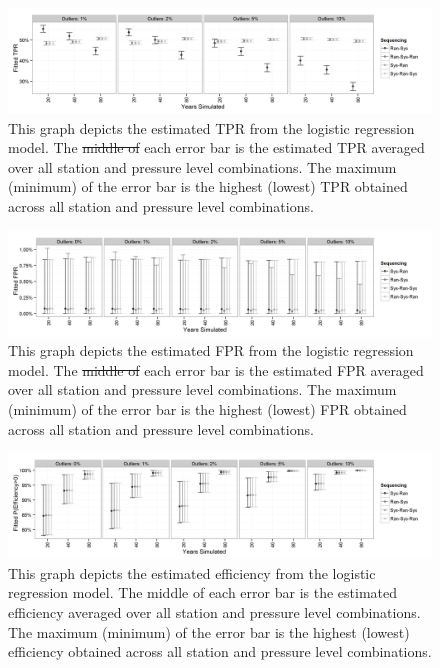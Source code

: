 \documentclass[12pt]{article}
\providecommand{\DIFaddtex}[1]{{\protect\color{blue}\uwave{#1}}} %
\providecommand{\DIFdeltex}[1]{{\protect\color{red}\sout{#1}}}                      %
\providecommand{\DIFaddFL}[1]{\DIFadd{#1}} %
\providecommand{\DIFdelFL}[1]{\DIFdel{#1}} %
\providecommand{\DIFaddbeginFL}{} %
\providecommand{\DIFaddendFL}{} %
\providecommand{\DIFdelbeginFL}{} %
\providecommand{\DIFdelendFL}{} %
\providecommand{\DIFadd}[1]{\texorpdfstring{\DIFaddtex{#1}}{#1}} %
\providecommand{\DIFdel}[1]{\texorpdfstring{\DIFdeltex{#1}}{}} %
\begin{document}
\begin{figure}[h!]
	\centering
	\includegraphics[width=\textwidth]{TPR_Order_Plot_BW}
	\caption{This graph depicts the estimated TPR from the logistic regression model.  The \DIFdelbeginFL \DIFdelFL{middle of }\DIFdelendFL \DIFaddbeginFL \DIFaddFL{dot in }\DIFaddendFL each error bar is the estimated TPR averaged over all station and pressure level combinations.  The maximum (minimum) of the error bar is the highest (lowest) TPR obtained across all station and pressure level combinations.}
	\label{fig:fitTPR}
\end{figure}

\begin{figure}[h!]
	\centering
	\includegraphics[width=\textwidth]{FPR_Order_Plot_BW}
	\caption{This graph depicts the estimated FPR from the logistic regression model.  The \DIFdelbeginFL \DIFdelFL{middle of }\DIFdelendFL \DIFaddbeginFL \DIFaddFL{dot in }\DIFaddendFL each error bar is the estimated FPR averaged over all station and pressure level combinations.  The maximum (minimum) of the error bar is the highest (lowest) FPR obtained across all station and pressure level combinations.  }
	\label{fig:fitFPR}
\end{figure}


\begin{figure}[h!]
	\centering
	\includegraphics[width=\textwidth]{Efficiency_Order_Plot_BW}
	\caption{This graph depicts the estimated efficiency from the logistic regression model.  The middle of each error bar is the estimated efficiency averaged over all station and pressure level combinations.  The maximum (minimum) of the error bar is the highest (lowest) efficiency obtained across all station and pressure level combinations.}
	\label{fig:fitEffOrd}
\end{figure}
\end{document}
